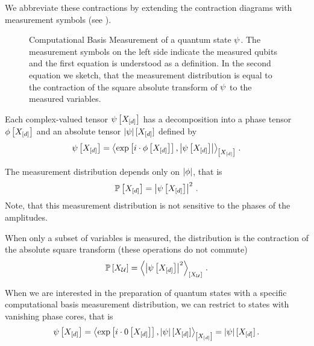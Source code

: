 We abbreviate these contractions by extending the contraction diagrams with measurement symbols (see ).
\begin{figure}
    \begin{center}
        
    \end{center}
    \caption{Computational Basis Measurement of a quantum state $\psi$.
    The measurement symbols on the left side indicate the measured qubits and the first equation is understood as a definition.
    In the second equation we sketch, that the measurement distribution is equal to the contraction of the square absolute transform of $\psi$ to the measured variables.
    }\label{fig:measurementSketch}
\end{figure}

Each complex-valued tensor $\psi\left[X_{[d]}\right]$ has a decomposition into a phase tensor $\phi\left[X_{[d]}\right]$ and an absolute tensor $\left|\psi\right|[X_{[d]}]$ defined by
\begin{align*}
    \psi\left[X_{[d]}\right]
    = \left\langle \mathrm{exp}\left[i\cdot\phi\left[X_{[d]}\right]\right], \left|\psi\left[X_{[d]}\right]\right|\right\rangle_{\left[ X_{[d]} \right]}\, .
\end{align*}

The measurement distribution depends only on $\left|\phi\right|$, that is
\begin{align*}
    \mathbb{P}\left[X_{[d]}\right]
    = \left|\psi\left[X_{[d]}\right]\right|^2 \, .
\end{align*}
Note, that this measurement distribution is not sensitive to the phases of the amplitudes.

When only a subset of variables is measured, the distribution is the contraction of the absolute square transform (these operations do not commute)
\begin{align*}
    \mathbb{P}\left[X_{\mathcal{U}}\right]
    = \left\langle \left|\psi\left[X_{[d]}\right]\right|^2\right\rangle_{\left[ X_{\mathcal{U}} \right]} \, .
\end{align*}

When we are interested in the preparation of quantum states with a specific computational basis measurement distribution, we can restrict to states with vanishing phase cores, that is
\begin{align*}
    \psi\left[X_{[d]}\right]
    = \left\langle \mathrm{exp}\left[i\cdot0\left[X_{[d]}\right]\right], \left|\psi\right|[X_{[d]}]\right\rangle_{\left[ X_{[d]} \right]}
    = \left|\psi\right|[X_{[d]}]  \, .
\end{align*}

